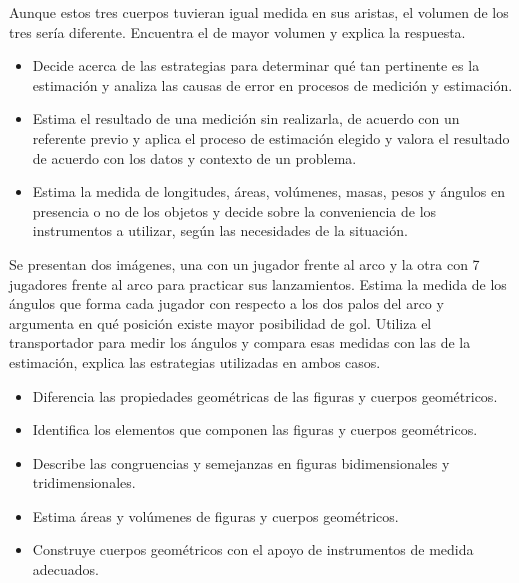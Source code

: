Aunque estos tres cuerpos tuvieran igual medida en sus aristas, el volumen de los tres sería diferente. Encuentra el de mayor volumen y explica la respuesta.


\evidencias

\begin{itemize}
  \item Decide acerca de las estrategias para determinar qué tan pertinente es la estimación y analiza las causas de error en procesos de medición y estimación.
  \item Estima el resultado de una medición sin realizarla, de acuerdo con un referente previo y aplica el proceso de estimación elegido y valora el resultado de acuerdo con los datos y contexto de un problema.
  \item Estima la medida de longitudes, áreas, volúmenes, masas, pesos y ángulos en presencia o no de los objetos y decide sobre la conveniencia de los instrumentos a utilizar, según las necesidades de la situación.
\end{itemize}

\ejemplo

Se presentan dos imágenes, una con un jugador frente al arco y la otra con 7 jugadores frente al arco para practicar sus lanzamientos. Estima la medida de los ángulos que forma cada jugador con respecto a los dos palos del arco y argumenta en qué posición existe mayor posibilidad de gol. Utiliza el transportador para medir los ángulos y compara esas medidas con las de la estimación, explica las estrategias utilizadas en ambos casos.





\evidencias

\begin{itemize}
  \item Diferencia las propiedades geométricas de las figuras y cuerpos geométricos.
  \item Identifica los elementos que componen las figuras y cuerpos geométricos.
  \item Describe las congruencias y semejanzas en figuras bidimensionales y tridimensionales.
  \item Estima áreas y volúmenes de figuras y cuerpos geométricos.
  \item Construye cuerpos geométricos con el apoyo de instrumentos de medida adecuados.
\end{itemize}

